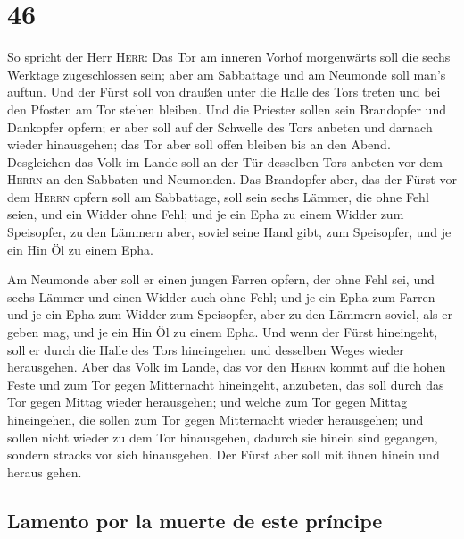 \hypertarget{section-45}{%
\section{46}\label{section-45}}

 So spricht der Herr \textsc{Herr}: Das Tor am inneren
Vorhof morgenwärts soll die sechs Werktage zugeschlossen sein; aber am
Sabbattage und am Neumonde soll man's auftun.  Und der
Fürst soll von draußen unter die Halle des Tors treten und bei den
Pfosten am Tor stehen bleiben. Und die Priester sollen sein Brandopfer
und Dankopfer opfern; er aber soll auf der Schwelle des Tors anbeten und
darnach wieder hinausgehen; das Tor aber soll offen bleiben bis an den
Abend.  Desgleichen das Volk im Lande soll an der Tür
desselben Tors anbeten vor dem \textsc{Herrn} an den Sabbaten und
Neumonden.  Das Brandopfer aber, das der Fürst vor dem
\textsc{Herrn} opfern soll am Sabbattage, soll sein sechs Lämmer, die
ohne Fehl seien, und ein Widder ohne Fehl;  und je ein
Epha zu einem Widder zum Speisopfer, zu den Lämmern aber, soviel seine
Hand gibt, zum Speisopfer, und je ein Hin Öl zu einem Epha.

 Am Neumonde aber soll er einen jungen Farren opfern, der
ohne Fehl sei, und sechs Lämmer und einen Widder auch ohne Fehl;
 und je ein Epha zum Farren und je ein Epha zum Widder zum
Speisopfer, aber zu den Lämmern soviel, als er geben mag, und je ein Hin
Öl zu einem Epha.  Und wenn der Fürst hineingeht, soll er
durch die Halle des Tors hineingehen und desselben Weges wieder
herausgehen.  Aber das Volk im Lande, das vor den
\textsc{Herrn} kommt auf die hohen Feste und zum Tor gegen Mitternacht
hineingeht, anzubeten, das soll durch das Tor gegen Mittag wieder
herausgehen; und welche zum Tor gegen Mittag hineingehen, die sollen zum
Tor gegen Mitternacht wieder herausgehen; und sollen nicht wieder zu dem
Tor hinausgehen, dadurch sie hinein sind gegangen, sondern stracks vor
sich hinausgehen.  Der Fürst aber soll mit ihnen hinein
und heraus gehen.

\hypertarget{lamento-por-la-muerte-de-este-pruxedncipe}{%
\subsection{Lamento por la muerte de este
príncipe}\label{lamento-por-la-muerte-de-este-pruxedncipe}}

